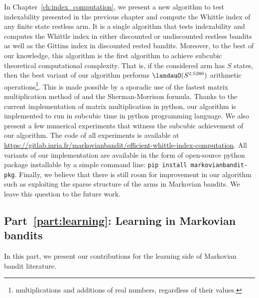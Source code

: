 In Chapter~\ref{ch:index_computation}, we present a new algorithm to test indexability presented in the previous chapter and compute the Whittle index of any finite state restless arm.
It is a single algorithm that tests indexability and computes the Whittle index in either discounted or undiscounted restless bandits as well as the Gittins index in discounted rested bandits.
Moreover, to the best of our knowledge, this algorithm is the first algorithm to achieve subcubic theoretical computational complexity.
That is, if the considered arm has $S$ states, then the best variant of our algorithm performs $\landauO(S^{2.5286})$ arithmetic operations\footnote{multiplications and additions of real numbers, regardless of their values.}.
This is made possible by a sporadic use of the fastest matrix multiplication method of \cite{coppersmith1987matrix} and the Sherman-Morrison formula.
Thanks to the current implementation of matrix multiplication in python, our algorithm is implemented to run in subcubic time in python programming language.
We also present a few numerical experiments that witness the subcubic achievement of our algorithm.
The code of all experiments is available at \url{https://gitlab.inria.fr/markovianbandit/efficient-whittle-index-computation}.
All variants of our implementation are available in the form of open-source python package installable by a simple command line: \texttt{pip install markovianbandit-pkg}.
Finally, we believe that there is still room for improvement in our algorithm such as exploiting the sparse structure of the arms in Markovian bandits.
We leave this question to the future work.

\subsection{Part~{\ref{part:learning}}: Learning in Markovian bandits}

In this part, we present our contributions for the learning side of Markovian bandit literature.

